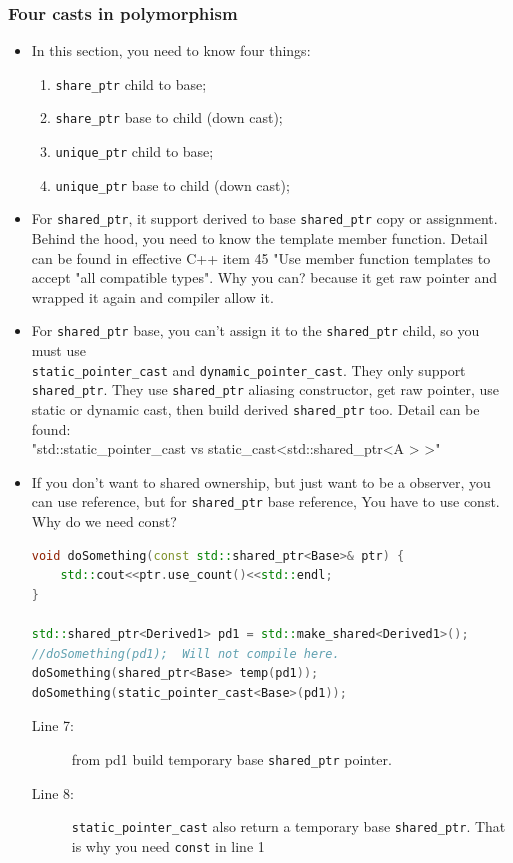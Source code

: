 \documentclass[a4paper,11pt,twoside]{book}
\begin{document}
\subsubsection{Four casts in polymorphism}
\begin{itemize}
\item In this section, you need to know four things:
\begin{enumerate}
\item \texttt{share\_ptr} child to base;
\item \texttt{share\_ptr} base to child (down cast);
\item \texttt{unique\_ptr} child to base;
\item \texttt{unique\_ptr} base to child (down cast);
\end{enumerate}

		\item For \texttt{shared\_ptr}, it support derived to base \texttt{shared\_ptr} copy or assignment. Behind the hood, you need to know the template member function. Detail can be found in effective C++ item 45 "Use member function templates to accept "all compatible types". Why you can? because it get raw pointer and wrapped it again and compiler allow it.

		\item  For \texttt{shared\_ptr} base, you can't assign it to the \texttt{shared\_ptr} child, so you must use \\ \texttt{static\_pointer\_cast} and \texttt{dynamic\_pointer\_cast}. They only support \texttt{shared\_ptr}. They use \texttt{shared\_ptr} aliasing constructor, get raw pointer, use static or dynamic cast, then build derived \texttt{shared\_ptr} too. Detail can be found: \\
			"std::static\_pointer\_cast vs static\_cast<std::shared\_ptr<A > >"

		\item If you don't want to shared ownership, but just want to be a observer, you can use reference, but for \texttt{shared\_ptr} base reference, You have to use const. Why do we need const?
	
\begin{lstlisting}[frame=single, language=c++, mathescape=true]
void doSomething(const std::shared_ptr<Base>& ptr) {
    std::cout<<ptr.use_count()<<std::endl; 
}

std::shared_ptr<Derived1> pd1 = std::make_shared<Derived1>();
//doSomething(pd1);  Will not compile here.
doSomething(shared_ptr<Base> temp(pd1));
doSomething(static_pointer_cast<Base>(pd1));
\end{lstlisting}
	\begin{description}
	\item[Line 7:] from pd1 build temporary base \texttt{shared\_ptr} pointer.
	\item[Line 8:] \texttt{static\_pointer\_cast} also return a temporary base \texttt{shared\_ptr}. That is why you need \texttt{const} in line 1
\end{description}



\end{itemize}
\end{document}
